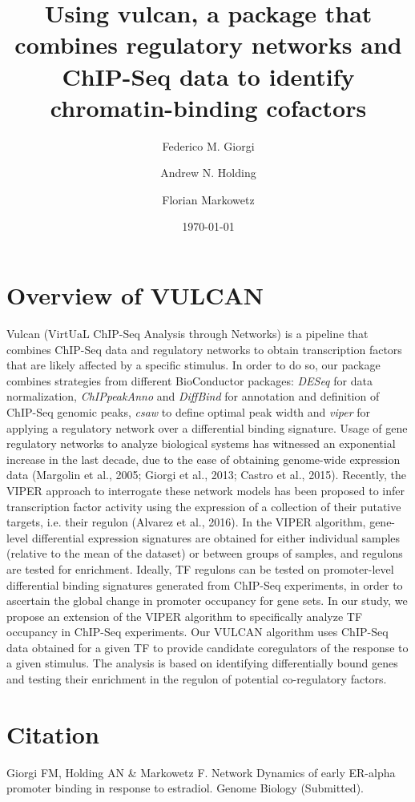 \documentclass{article}
\title{Using vulcan, a package that combines regulatory networks and ChIP-Seq data to identify chromatin-binding cofactors}
\author[1]{Federico M. Giorgi}
\author[1]{Andrew N. Holding}
\author[1]{Florian Markowetz}
\affil[1]{Cancer Research UK, Cambridge Institute, Robinson Way, Cambridge United Kingdom}
\date{\today}
\begin{document}

\maketitle

\section{Overview of VULCAN}\label{sec:overview}
Vulcan (VirtUaL ChIP-Seq Analysis through Networks) is a pipeline that combines ChIP-Seq data and regulatory networks to obtain transcription factors that are likely affected by a specific stimulus. In order to do so, our package combines strategies from different BioConductor packages: \emph{DESeq} for data normalization, \emph{ChIPpeakAnno} and \emph{DiffBind} for annotation and definition of ChIP-Seq genomic peaks, \emph{csaw} to define optimal peak width and \emph{viper} for applying a regulatory network over a differential binding signature.
Usage of gene regulatory networks to analyze biological systems has witnessed an exponential increase in the last decade, due to the ease of obtaining genome-wide expression data (Margolin et al., 2005; Giorgi et al., 2013; Castro et al., 2015). Recently, the VIPER approach to interrogate these network models has been proposed to infer transcription factor activity using the expression of a collection of their putative targets, i.e. their regulon (Alvarez et al., 2016). In the VIPER algorithm, gene-level differential expression signatures are obtained for either individual samples (relative to the mean of the dataset) or between groups of samples, and regulons are tested for enrichment. Ideally, TF regulons can be tested on promoter-level differential binding signatures generated from ChIP-Seq experiments, in order to ascertain the global change in promoter occupancy for gene sets. In our study, we propose an extension of the VIPER algorithm to specifically analyze TF occupancy in ChIP-Seq experiments. Our VULCAN algorithm uses ChIP-Seq data obtained for a given TF to provide candidate coregulators of the response to a given stimulus. The analysis is based on identifying differentially bound genes and testing their enrichment in the regulon of potential co-regulatory factors.

\section{Citation}
Giorgi FM, Holding AN \& Markowetz F. Network Dynamics of early ER-alpha promoter binding in response to estradiol. Genome Biology (Submitted).
\end{document}
